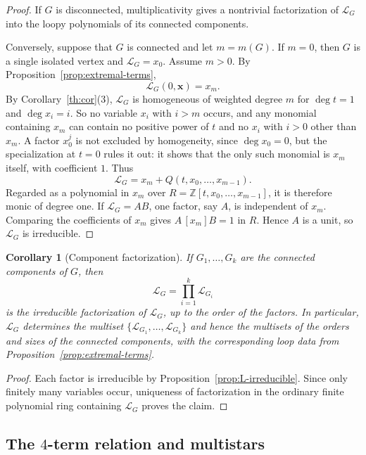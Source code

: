 \documentclass[11pt]{article}
\theoremstyle{plain}
\newtheorem{corollary}[theorem]{Corollary}
\theoremstyle{definition}
\renewcommand{\mathcal}{\mathscr}
\newcommand{\LL}{\mathcal{L}}    %
\newcommand{\bx}{\mathbf{x}}
\newcommand{\ZZ}{\mathbb Z}
\numberwithin{equation}{section}
\begin{document}
\begin{proof}
If $G$ is disconnected, multiplicativity gives a nontrivial factorization of
$\LL_G$ into the loopy polynomials of its connected components.

Conversely, suppose that $G$ is connected and let $m=m(G)$.  If $m=0$, then
$G$ is a single isolated vertex and $\LL_G=x_0$.  Assume $m>0$.  By
Proposition~\ref{prop:extremal-terms},
\[
   \LL_G(0,\bx)=x_m.
\]
By Corollary~\ref{th:cor}(3), $\LL_G$ is homogeneous of weighted degree $m$
for $\deg t=1$ and $\deg x_i=i$.
So no variable $x_i$ with $i>m$ occurs,
and any monomial containing $x_m$ can contain no positive power of $t$ and no
$x_i$ with $i>0$ other than $x_m$.  A factor $x_0^j$ is not excluded by
homogeneity, since $\deg x_0=0$, but the specialization at $t=0$ rules it out:
it shows that the only such monomial is $x_m$ itself, with coefficient $1$.  Thus
\begin{equation}\label{eq:connected-monic-form}
   \LL_G=x_m+Q(t,x_0,\ldots,x_{m-1}).
\end{equation}
Regarded as a polynomial in $x_m$ over
$R=\ZZ[t,x_0,\ldots,x_{m-1}]$, it is therefore monic of degree one.
If $\LL_G=AB$, one factor, say $A$, is independent of $x_m$.  Comparing the
coefficients of $x_m$ gives $A\,[x_m]B=1$ in $R$.  Hence $A$ is a unit, so
$\LL_G$ is irreducible.
\end{proof}

\begin{corollary}[Component factorization]\label{cor:L-component-factorization}
If  $G_1,\ldots,G_k$ are the connected components of $G$, then
\[
   \LL_G=\prod_{i=1}^k\LL_{G_i}
\]
is the irreducible factorization of $\LL_G$, up to the order of the factors.
In particular, $\LL_G$ determines the multiset
$\{\LL_{G_1},\ldots,\LL_{G_k}\}$ and hence the multisets of the orders and
sizes of the connected components, with the corresponding loop data from
Proposition~\ref{prop:extremal-terms}.
\end{corollary}

\begin{proof}
Each factor is irreducible by Proposition~\ref{prop:L-irreducible}.  Since
only finitely many variables occur, uniqueness of factorization in the ordinary finite polynomial ring containing $\LL_G$ proves the claim.
\end{proof}

\subsection{The \texorpdfstring{$4$}{4}-term relation and  multistars}
\label{sec:4-terms}
\end{document}

